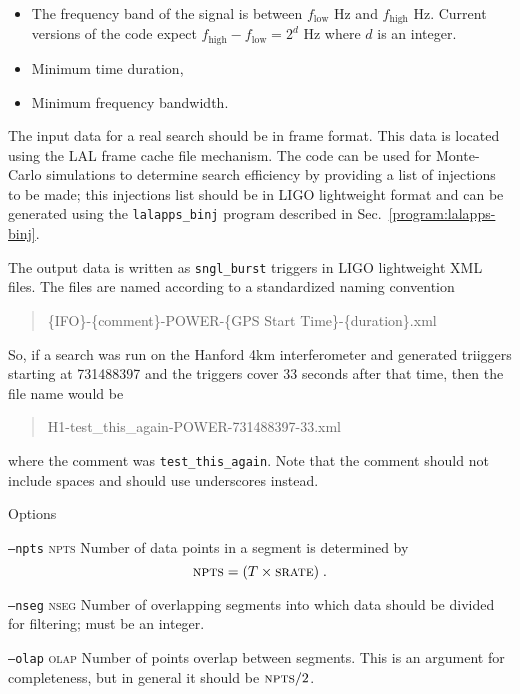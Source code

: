 \begin{entry}
\begin{itemize}
\item The frequency band of the signal is between $f_{\mathrm{low}}$
Hz and ${f_{\mathrm{high}}}$ Hz.  Current versions of the code
expect ${f_{\mathrm{high}}}-{f_{\mathrm{low}}}=2^d$ Hz where
$d$ is an integer. 

\item Minimum time duration,

\item Minimum frequency bandwidth.
\end{itemize}

The input data for a real search should be in frame format.   This
data is located using the LAL frame cache file mechanism.    The code
can be used for Monte-Carlo simulations to determine search efficiency
by providing a list of injections to be made;  this injections list
should be in LIGO lightweight format and can be generated using the
\verb+lalapps_binj+ program described in Sec.~\ref{program:lalapps-binj}. 

The output data is written as \verb+sngl_burst+ triggers in LIGO
lightweight XML files.   The files are named according to a
standardized naming convention
\begin{quote}
\{IFO\}-\{comment\}-POWER-\{GPS Start Time\}-\{duration\}.xml
\end{quote}
So,  if a search was run on the Hanford 4km interferometer and
generated triiggers starting at 731488397 and the triggers cover 33
seconds after that time,  then the file name would be 
\begin{quote}
H1-test\_this\_again-POWER-731488397-33.xml
\end{quote}
where the comment was \verb+test_this_again+.   Note that the comment
should not include spaces and should use underscores instead.

\item[Options]\leavevmode
\begin{entry}
\item[\texttt{--npts}  \textsc{npts}] Number of data points in a
segment is determined by
\[
\mbox{\textsc{npts}} = (T \times \mbox{\textsc{srate}}) \; .
\]  

\item[\texttt{--nseg} \textsc{nseg}] Number of overlapping segments into
which data should be divided for filtering;  must be an integer. 

\item[\texttt{--olap} \textsc{olap}] Number of points overlap between
segments.  This is an argument for completeness,  but in general it
should be $\textsc{npts}/2$.


\end{entry}
\end{entry}
